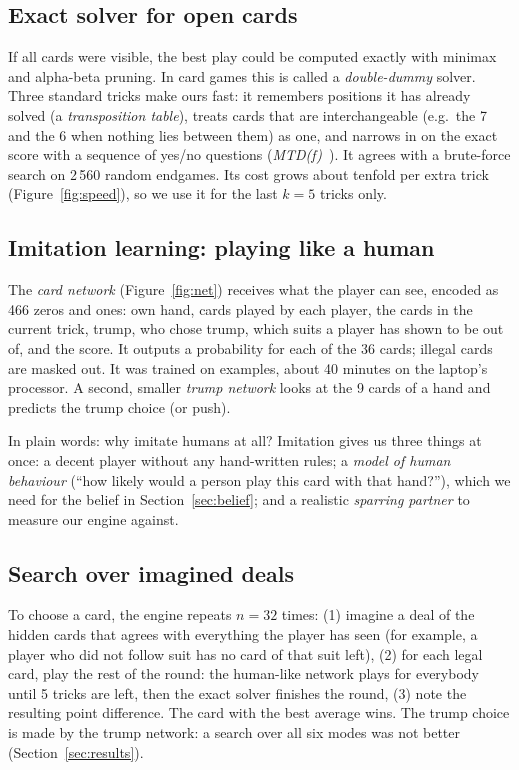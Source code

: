 \documentclass[10pt,a4paper]{article}
\begin{document}
\subsection{Exact solver for open cards}\label{sec:dd}
If all cards were visible, the best play could be computed exactly with minimax and alpha-beta pruning. In card games
this is called a \emph{double-dummy} solver. Three standard tricks make ours fast: it remembers positions it has already
solved (a \emph{transposition table}), treats cards that are interchangeable (e.g.\ the 7 and the 6 when nothing lies
between them) as one, and narrows in on the exact score with a sequence of yes/no questions (\emph{MTD(f)}~\cite{mtdf}).
It agrees with a brute-force search on 2\,560 random endgames. Its cost grows about tenfold per extra trick
(Figure~\ref{fig:speed}), so we use it for the last $k=5$ tricks only.

\subsection{Imitation learning: playing like a human}\label{sec:imitation}
The \emph{card network} (Figure~\ref{fig:net}) receives what the player can see, encoded as 466 zeros and ones:
own hand, cards played by each player, the cards in the current trick, trump, who chose trump, which suits a player
has shown to be out of, and the score. It outputs a probability for each of the 36 cards; illegal cards are masked out.
It was trained on \CardSamples{} examples, about 40 minutes on the laptop's processor. A second, smaller
\emph{trump network} looks at the 9 cards of a hand and predicts the trump choice (or push).

\begin{plain}{In plain words: why imitate humans at all?}
Imitation gives us three things at once: a decent player without any hand-written rules; a \emph{model of human
behaviour} (``how likely would a person play this card with that hand?''), which we need for the belief in
Section~\ref{sec:belief}; and a realistic \emph{sparring partner} to measure our engine against.
\end{plain}

\subsection{Search over imagined deals}\label{sec:pimc}
To choose a card, the engine repeats $n=32$ times: (1) imagine a deal of the hidden cards that agrees with everything the
player has seen (for example, a player who did not follow suit has no card of that suit left), (2) for each legal
card, play the rest of the round: the human-like network plays for everybody until 5 tricks are left, then the exact
solver finishes the round, (3) note the resulting point difference. The card with the best average wins.
The trump choice is made by the trump network: a search over all six modes was not better (Section~\ref{sec:results}).
\end{document}
